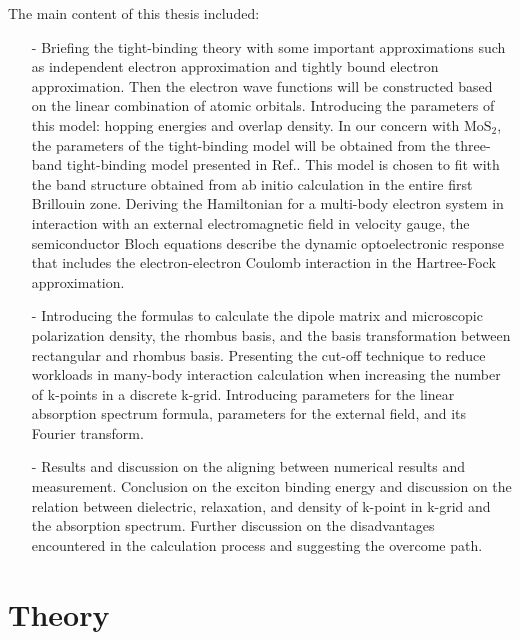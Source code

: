 \documentclass[12pt,english,a4paper]{article}
\begin{document}
The main content of this thesis included: 
\begin{itemize}
	\item[-] Briefing the tight-binding theory with some important approximations such as independent electron approximation and tightly bound electron approximation. Then the electron wave functions will be constructed based on the linear combination of atomic orbitals. Introducing the parameters of this model: hopping energies and overlap density. In our concern with $\mathrm{MoS}_2$, the parameters of the tight-binding model will be obtained from the three-band tight-binding model presented in Ref.\cite{liu_three-band_2013}. This model is chosen to fit with the band structure obtained from ab initio calculation in the entire first Brillouin zone. Deriving the Hamiltonian for a multi-body electron system in interaction with an external electromagnetic field in velocity gauge, the semiconductor Bloch equations describe the dynamic optoelectronic response that includes the electron-electron Coulomb interaction in the Hartree-Fock approximation.
	\item[-] Introducing the formulas to calculate the dipole matrix and microscopic polarization density, the rhombus basis, and the basis transformation between rectangular and rhombus basis. Presenting the cut-off technique to reduce workloads in many-body interaction calculation when increasing the number of k-points in a discrete k-grid. Introducing parameters for the linear absorption spectrum formula, parameters for the external field, and its Fourier transform.
	\item[-] Results and discussion on the aligning between numerical results and measurement. Conclusion on the exciton binding energy and discussion on the relation between dielectric, relaxation, and density of k-point in k-grid and the absorption spectrum. Further discussion on the disadvantages encountered in the calculation process and suggesting the overcome path. 
\end{itemize}
	\newpage
	\section{Theory}
\end{document}
